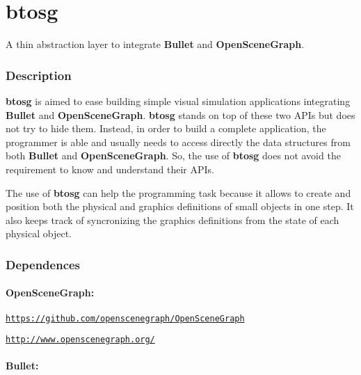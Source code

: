 \href{https://travis-ci.org/miguelleitao/btosg}{\tt } \section*{btosg}

A thin abstraction layer to integrate {\bfseries Bullet} and {\bfseries Open\+Scene\+Graph}.

\subsubsection*{Description}

{\bfseries btosg} is aimed to ease building simple visual simulation applications integrating {\bfseries Bullet} and {\bfseries Open\+Scene\+Graph}. {\bfseries btosg} stands on top of these two A\+P\+Is but does not try to hide them. Instead, in order to build a complete application, the programmer is able and usually needs to access directly the data structures from both {\bfseries Bullet} and {\bfseries Open\+Scene\+Graph}. So, the use of {\bfseries btosg} does not avoid the requirement to know and understand their A\+P\+Is.

The use of {\bfseries btosg} can help the programming task because it allows to create and position both the physical and graphics definitions of small objects in one step. It also keeps track of syncronizing the graphics definitions from the state of each physical object.

\subsubsection*{Dependences}

\paragraph*{Open\+Scene\+Graph\+:}


\begin{DoxyItemize}
\item \href{https://github.com/openscenegraph/OpenSceneGraph}{\tt https\+://github.\+com/openscenegraph/\+Open\+Scene\+Graph}
\item \href{http://www.openscenegraph.org/}{\tt http\+://www.\+openscenegraph.\+org/} \paragraph*{Bullet\+:}
\end{DoxyItemize}


